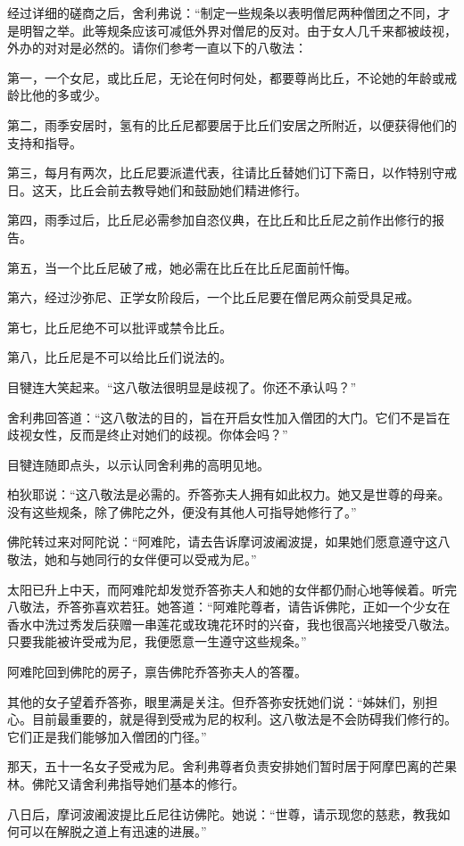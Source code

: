 \documentclass[12pt,twoside,openany]{book}
\begin{document}
经过详细的磋商之后，舍利弗说：“制定一些规条以表明僧尼两种僧团之不同，才是明智之举。此等规条应该可减低外界对僧尼的反对。由于女人几千来都被歧视，外办的对对是必然的。请你们参考一直以下的八敬法：

第一，一个女尼，或比丘尼，无论在何时何处，都要尊尚比丘，不论她的年龄或戒龄比他的多或少。

第二，雨季安居时，氢有的比丘尼都要居于比丘们安居之所附近，以便获得他们的支持和指导。

第三，每月有两次，比丘尼要派遣代表，往请比丘替她们订下斋日，以作特别守戒日。这天，比丘会前去教导她们和鼓励她们精进修行。

第四，雨季过后，比丘尼必需参加自恣仪典，在比丘和比丘尼之前作出修行的报告。

第五，当一个比丘尼破了戒，她必需在比丘在比丘尼面前忏悔。

第六，经过沙弥尼、正学女阶段后，一个比丘尼要在僧尼两众前受具足戒。

第七，比丘尼绝不可以批评或禁令比丘。

第八，比丘尼是不可以给比丘们说法的。

目犍连大笑起来。“这八敬法很明显是歧视了。你还不承认吗？”

舍利弗回答道：“这八敬法的目的，旨在开启女性加入僧团的大门。它们不是旨在歧视女性，反而是终止对她们的歧视。你体会吗？”

目犍连随即点头，以示认同舍利弗的高明见地。

柏狄耶说：“这八敬法是必需的。乔答弥夫人拥有如此权力。她又是世尊的母亲。没有这些规条，除了佛陀之外，便没有其他人可指导她修行了。”

佛陀转过来对阿陀说：“阿难陀，请去告诉摩诃波阇波提，如果她们愿意遵守这八敬法，她和与她同行的女伴便可以受戒为尼。”

太阳已升上中天，而阿难陀却发觉乔答弥夫人和她的女伴都仍耐心地等候着。听完八敬法，乔答弥喜欢若狂。她答道：“阿难陀尊者，请告诉佛陀，正如一个少女在香水中洗过秀发后获赠一串莲花或玫瑰花环时的兴奋，我也很高兴地接受八敬法。只要我能被许受戒为尼，我便愿意一生遵守这些规条。”

阿难陀回到佛陀的房子，禀告佛陀乔答弥夫人的答覆。

其他的女子望着乔答弥，眼里满是关注。但乔答弥安抚她们说：“姊妹们，别担心。目前最重要的，就是得到受戒为尼的权利。这八敬法是不会防碍我们修行的。它们正是我们能够加入僧团的门径。”

那天，五十一名女子受戒为尼。舍利弗尊者负责安排她们暂时居于阿摩巴离的芒果林。佛陀又请舍利弗指导她们基本的修行。

八日后，摩诃波阇波提比丘尼往访佛陀。她说：“世尊，请示现您的慈悲，教我如何可以在解脱之道上有迅速的进展。”
\end{document}
